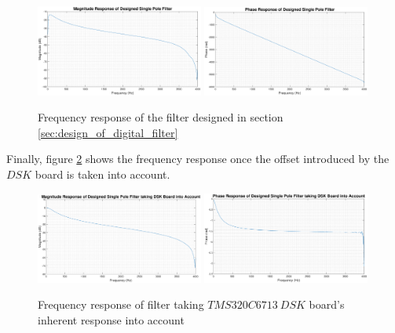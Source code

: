 \documentclass{article}
\begin{document}
\begin{figure}[H]
    \centering
    \includegraphics[width=0.49\textwidth]{mag_response_designed_single_pole_filter}
    \includegraphics[width=0.49\textwidth]{phase_response_designed_single_pole_filter}
    \caption{Frequency response of the filter designed in section \ref{sec:design_of_digital_filter}}
    \label{fig:old_filter}
\end{figure}

Finally, figure \ref{fig:old_filter_subtracted} shows the frequency response once the offset introduced by the $DSK$ board is taken into account.

\begin{figure}[H]
    \centering
    \includegraphics[width=0.49\textwidth]{mag_response_designed_single_pole_filter_with_DSK_taken_into_account}
    \includegraphics[width=0.49\textwidth]{monir_update}
    \caption{Frequency response of filter taking  $TMS320C6713 \ DSK$ board's inherent response into account}
    \label{fig:old_filter_subtracted}
\end{figure}
\end{document}

